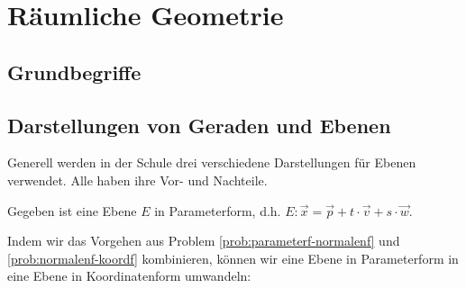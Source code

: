 \chapter{Räumliche Geometrie}

\section{Grundbegriffe}


\section{Darstellungen von Geraden und Ebenen}
Generell werden in der Schule drei verschiedene Darstellungen für Ebenen verwendet. Alle haben ihre Vor- und Nachteile. 

\begin{problem} \label{prob:parameterf-normalenf}
    
\end{problem}

\begin{problem} \label{prob:normalenf-koordf}
    Gegeben ist eine Ebene \(E\) in Parameterform, d.h. \(E: \vec x = \vec p + t \cdot \vec v + s\cdot \vec w\). 
\end{problem}

Indem wir das Vorgehen aus Problem \ref{prob:parameterf-normalenf} und \ref{prob:normalenf-koordf} kombinieren, können wir eine Ebene in Parameterform in eine Ebene in Koordinatenform umwandeln: 

\begin{problem}
    
\end{problem}

